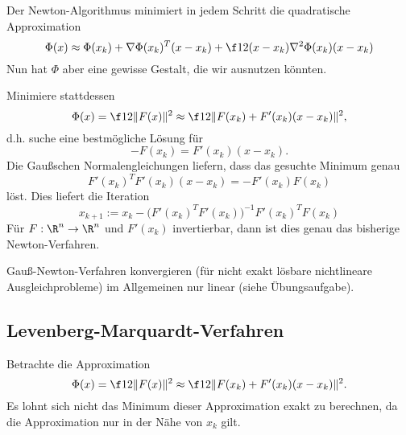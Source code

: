 Der Newton-Algorithmus minimiert in jedem Schritt die quadratische Approximation
\[
	\Phi(x) \approx \Phi(x_k) + \nabla \Phi(x_k)^T (x-x_k) + \f 12 (x-x_k) \nabla^2 \Phi(x_k) (x-x_k)
\]
Nun hat $\Phi$ aber eine gewisse Gestalt, die wir ausnutzen könnten.

Minimiere stattdessen
\[
	\Phi(x)
	= \f 12 \|F(x)\|^2
	\approx \f 12 \|F(x_k) + F'(x_k) (x-x_k) \|^2,
\]
d.h. suche eine bestmögliche Lösung für
\[
	-F(x_k) = F'(x_k)(x - x_k).
\]
Die Gaußschen Normalengleichungen liefern, dass das gesuchte Minimum genau
\[
	F'(x_k)^T F'(x_k) (x-x_k) = - F'(x_k)F(x_k)
\]
löst.
Dies liefert die Iteration
\[
	x_{k+1}
	:= x_k - \big(F'(x_k)^T F'(x_k)\big)^{-1} F'(x_k)^T F(x_k)
\]
Für $F: \R^n \to \R^n$ und $F'(x_k)$ invertierbar, dann ist dies genau das bisherige Newton-Verfahren.

\begin{alg} \label{alg:9}
	\begin{algorithmic}
		\EndWhile
	\end{algorithmic}
\end{alg}

Gauß-Newton-Verfahren konvergieren (für nicht exakt lösbare nichtlineare Ausgleichprobleme) im Allgemeinen nur linear (siehe Übungsaufgabe).


\subsection{Levenberg-Marquardt-Verfahren}

Betrachte die Approximation
\[
	\Phi(x)
	= \f 12 \|F(x)\|^2
	\approx \f 12 \|F(x_k) + F'(x_k) (x-x_k) \|^2.
\]
Es lohnt sich nicht das Minimum dieser Approximation exakt zu berechnen, da die Approximation nur in der Nähe von $x_k$ gilt.

